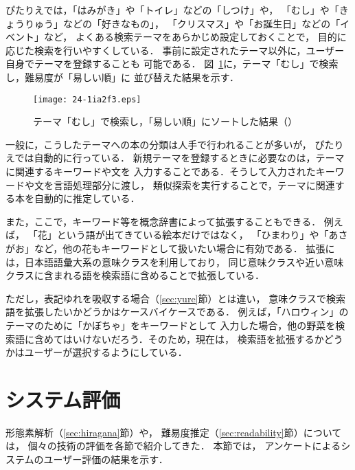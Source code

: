 \documentclass[japanese]{jnlp_1.4}
\newcommand{\changedB}[1]{}
\renewcommand{\changedB}[1]{}
\begin{document}
ぴたりえでは，「はみがき」や「トイレ」などの「しつけ」や，
「むし」や「きょうりゅう」などの「好きなもの」，
「クリスマス」や「お誕生日」などの「イベント」など，
よくある検索テーマをあらかじめ設定しておくことで，
目的に応じた検索を行いやすくしている．
事前に設定されたテーマ以外に，ユーザー自身でテーマを登録することも
可能である．
図~\ref{fig:theme-readability}に，テーマ「むし」で検索し，難易度が「易しい順」に
並び替えた結果を示す．

\begin{figure}[t]
\begin{center}
\texttt{[image: 24-1ia2f3.eps]}
\end{center}
\caption{テーマ「むし」で検索し，「易しい順」にソートした結果（\changedB{図中の絵本の書誌情報は付録を参照}）}
\label{fig:theme-readability}
\end{figure}

一般に，こうしたテーマへの本の分類は人手で行われることが多いが，
ぴたりえでは自動的に行っている．
新規テーマを登録するときに必要なのは，テーマに関連するキーワードや文を
入力することである．そうして入力されたキーワードや文を言語処理部分に渡し，
類似探索を実行することで，テーマに関連する本を自動的に推定している．

また，ここで，キーワード等を概念辞書によって拡張することもできる\cite{Hattori:Fujita:Aoyama:2015j}．
例えば，
「花」という語が出てきている絵本だけではなく，
「ひまわり」や「あさがお」など，他の花もキーワードとして扱いたい場合に有効である．
拡張には，日本語語彙大系\cite{GoiTaikeij}の意味クラスを利用しており，
同じ意味クラスや近い意味クラスに含まれる語を検索語に含めることで拡張している．

ただし，表記ゆれを吸収する場合（\ref{sec:yure}節）とは違い，
意味クラスで検索語を拡張したいかどうかはケースバイケースである．
例えば，「ハロウィン」のテーマのために「かぼちゃ」をキーワードとして
入力した場合，他の野菜を検索語に含めてはいけないだろう．そのため，現在は，
検索語を拡張するかどうかはユーザーが選択するようにしている．





\section{システム評価}\label{sec:eva}


形態素解析（\ref{sec:hiragana}節）や，
難易度推定（\ref{sec:readability}節）については，
個々の技術の評価を各節で紹介してきた．
本節では，
アンケートによるシステムのユーザー評価の結果を示す．
\end{document}
